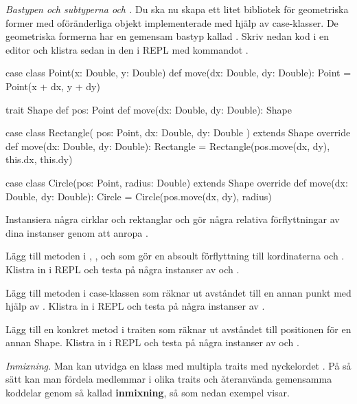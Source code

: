 \Task \emph{Bastypen  och subtyperna  och .} Du ska nu skapa ett litet bibliotek för geometriska former med oföränderliga objekt implementerade med hjälp av case-klasser. De geometriska formerna har en gemensam bastyp kallad . Skriv nedan kod i en editor och klistra sedan in den i REPL med kommandot .
\begin{Code}
case class Point(x: Double, y: Double) {
  def move(dx: Double, dy: Double): Point = Point(x + dx, y + dy)
}

trait Shape {
  def pos: Point
  def move(dx: Double, dy: Double): Shape
}

case class Rectangle(
  pos: Point, 
  dx: Double,
  dy: Double
) extends Shape {
  override def move(dx: Double, dy: Double): Rectangle = 
    Rectangle(pos.move(dx, dy), this.dx, this.dy)
}

case class Circle(pos: Point, radius: Double) extends Shape {
  override def move(dx: Double, dy: Double): Circle = 
    Circle(pos.move(dx, dy), radius)
}
\end{Code}

\Subtask Instansiera några cirklar och rektanglar och gör några relativa förflyttningar av dina instanser genom att anropa . 

\Subtask Lägg till metoden  i , ,  och  som gör en absoult förflyttning till kordinaterna  och . Klistra in i REPL och testa på några instanser av  och .

\Subtask Lägg till metoden  i case-klassen  som räknar ut avståndet till en annan punkt med hjälp av . Klistra in i REPL och testa på några instanser av .

\Subtask Lägg till en konkret metod  i traiten  som räknar ut avståndet till positionen för en annan Shape. Klistra in i REPL och testa på några instanser av  och .

 





\Task \label{task:fyle} \emph{Inmixning.} Man kan utvidga en klass med multipla traits med nyckelordet . På så sätt kan man fördela medlemmar i olika traits och återanvända gemensamma koddelar genom så kallad \textbf{inmixning}, så som nedan exempel visar. 

